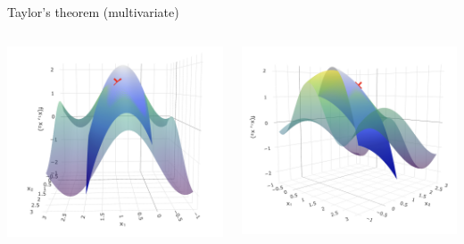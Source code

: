 \documentclass[11pt,compress,t,notes=noshow, xcolor=table]{beamer}
\begin{document}
\begin{vbframe}{Taylor's theorem (multivariate)}
\begin{columns}
    \begin{column}{0.4\textwidth}
        \includegraphics[width = \textwidth]{figure_man/Taylor2D_2nd-100.png}
    \end{column}
    \begin{column}{0.4\textwidth}
        \includegraphics[width = \textwidth]{figure_man/Taylor2D_2nd-301.png}
    \end{column}
\end{columns}

\end{vbframe}
\end{document}

